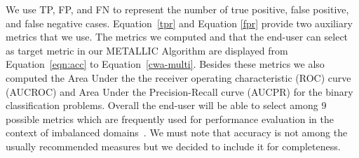 \documentclass{article}
\begin{document}
We use TP, FP, and FN to represent the number of true positive, false positive, and false negative cases. Equation~\autoref{tpr} and Equation \autoref{fpr} provide two auxiliary metrics that we use. The metrics we computed and that the end-user can select as target metric in our METALLIC Algorithm are displayed from Equation~\autoref{eqn:acc} to Equation~\autoref{cwa-multi}. Besides these metrics we also computed the Area Under the the receiver operating characteristic (ROC) curve (AUCROC) and Area Under the Precision-Recall curve (AUCPR) for the binary classification problems. Overall the end-user will be able to select among 9 possible metrics which are frequently used for performance evaluation in the context of imbalanced domains~\cite{brancoSurveyPredictiveModeling2016}. We must note that accuracy is not among the usually recommended measures but we decided to include it for completeness. 

\end{document}
